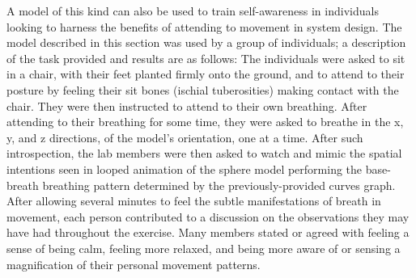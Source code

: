 \documentclass[arts,article,submit,moreauthors,pdftex,10pt,a4paper]{mdpi}
\begin{document}
A model of this kind can also be used to train self-awareness in individuals looking to harness the benefits of attending to movement in system design. The model described in this section was used by a group of individuals; a description of the task provided and results are as follows: The individuals were asked to sit in a chair, with their feet planted firmly onto the ground, and to attend to their posture by feeling their sit bones (ischial tuberosities) making contact with the chair. They were then instructed to attend to their own breathing. After attending to their breathing for some time, they were asked to breathe in the x, y, and z directions, of the model’s orientation, one at a time. After such introspection, the lab members were then asked to watch and mimic the spatial intentions seen in looped animation of the sphere model performing the base-breath breathing pattern determined by the previously-provided curves graph. After allowing several minutes to feel the subtle manifestations of breath in movement, each person contributed to a discussion on the observations they may have had throughout the exercise. Many members stated or agreed with feeling a sense of being calm, feeling more relaxed, and being more aware of or sensing a magnification of their personal movement patterns.
\end{document}
